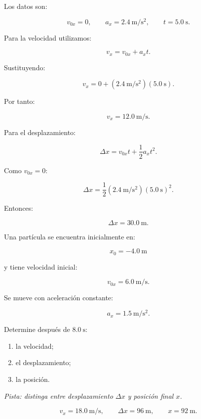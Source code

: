 \begin{explicacion}
Los datos son:

\[
v_{0x}=0,
\qquad
a_x=\SI{2.4}{\meter\per\second\squared},
\qquad
t=\SI{5.0}{\second}.
\]

Para la velocidad utilizamos:

\[ v_x=v_{0x}+a_xt. \]

Sustituyendo:

\[
v_x
=
0+
(\SI{2.4}{\meter\per\second\squared})
(\SI{5.0}{\second}).
\]

Por tanto:

\[ \boxed{v_x=\SI{12.0}{\meter\per\second}}. \]

Para el desplazamiento:

\[ \Delta x=v_{0x}t+\frac{1}{2}a_xt^2. \]

Como \(v_{0x}=0\):

\[
\Delta x
=
\frac{1}{2}
(\SI{2.4}{\meter\per\second\squared})
(\SI{5.0}{\second})^2.
\]

Entonces:

\[ \boxed{\Delta x=\SI{30.0}{\meter}}. \]
\end{explicacion}


\begin{ejercicio}
Una partícula se encuentra inicialmente en:

\[ x_0=-\SI{4.0}{\meter} \]

y tiene velocidad inicial:

\[ v_{0x}=\SI{6.0}{\meter\per\second}. \]

Se mueve con aceleración constante:

\[ a_x=\SI{1.5}{\meter\per\second\squared}. \]

Determine después de \(\SI{8.0}{\second}\):

\begin{enumerate}[label=\alph*)]
    \item la velocidad;
    \item el desplazamiento;
    \item la posición.
\end{enumerate}

\textit{Pista: distinga entre desplazamiento \(\Delta x\) y posición final \(x\).}
\end{ejercicio}

\begin{respuesta}
\[
v_x=\SI{18.0}{\meter\per\second},
\qquad
\Delta x=\SI{96}{\meter},
\qquad
x=\SI{92}{\meter}.
\]
\end{respuesta}

